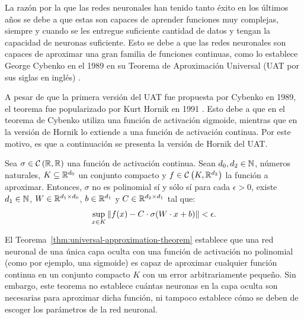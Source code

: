 {{    La razón por la que las redes neuronales han tenido tanto éxito en los últimos años se debe a que estas son capaces de aprender funciones muy complejas, siempre y cuando se les entregue suficiente cantidad de datos y tengan la capacidad de neuronas suficiente. Esto se debe a que las redes neuronales son capaces de aproximar una gran familia de funciones continuas, como lo establece George Cybenko en el 1989 en su Teorema de Aproximación Universal (UAT por sus siglas en inglés) \cite{cybenko1989approximation}.

    A pesar de que la primera versión del UAT fue propuesta por Cybenko en 1989, el teorema fue popularizado por Kurt Hornik en 1991 \cite{hornik1991approximation}. Esto debe a que en el teorema de Cybenko utiliza una función de activación sigmoide, mientras que en la versión de Hornik lo extiende a una función de activación continua. Por este motivo, es que a continuación se presenta la versión de Hornik del UAT.
    \begin{theorem}\label{thm:universal-approximation-theorem}
        Sea $\sigma \in \ContSpace[\R, \R]$ una función de activación continua.
        Sean $d_0, d_2 \in \mathbb{N}$, números naturales, $K \subseteq \mathbb{R}^{d_0}$ un conjunto compacto y $f \in \ContSpace[K, \R^{d_2}]$ la función a aproximar.
        Entonces, $\sigma$ no es polinomial sí y sólo sí para cada $\epsilon > 0$, existe $d_1\in\mathbb{N}$, ${W} \in \mathbb{R}^{d_1 \times d_0}$, $b \in \mathbb{R}^{d_1}$ y $C \in \mathbb{R}^{d_2 \times d_1}$ tal que:
        \begin{equation}
            \sup_{\vx \in K} \left\| f(\vx) - C \cdot \sigma(\vW \cdot \vx + b) \right\| < \epsilon.
        \end{equation}
    \end{theorem}

    \begin{remark}
        El Teorema~\ref{thm:universal-approximation-theorem} establece que una red neuronal de una única capa oculta con una función de activación no polinomial (como por ejemplo, una sigmoide) es capaz de aproximar cualquier función continua en un conjunto compacto $K$ con un error arbitrariamente pequeño. Sin embargo, este teorema no establece cuántas neuronas en la capa oculta son necesarias para aproximar dicha función, ni tampoco establece cómo se deben de escoger los parámetros de la red neuronal.
    \end{remark}

}}
